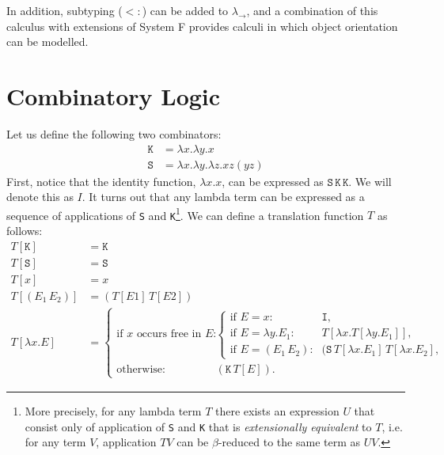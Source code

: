 \documentclass[11pt,twoside,a4paper]{article} %
\newcommand{\sym}[1]{\texttt{#1}}
\newcommand{\msym}[1]{\mathtt{#1}}
\begin{document}
In addition, subtyping ($<:$) can be added to $\lambda_\rightarrow$, and a
combination of this calculus with extensions of System F provides calculi in
which object orientation can be modelled.

\section{Combinatory Logic}

Let us define the following two combinators:
\begin{align*}
\msym{K} &= \lambda x.\lambda y.x \\
\msym{S} &= \lambda x.\lambda y.\lambda z.x z (y z)
\end{align*}
First, notice that the identity function, $\lambda x.x$, can be expressed as 
$\msym{S}\,\msym{K}\,\msym{K}$. We will denote this as $I$. It turns out that any 
lambda term can be expressed as a sequence of applications 
of \sym{S} and \sym{K}\footnote{More precisely, for any lambda term $T$ there exists an
expression $U$ that consist only of application of \sym{S} and \sym{K} that is 
\textit{extensionally equivalent} to $T$, i.e. for any term $V$, application $TV$ can be
$\beta$-reduced to the same term as $UV$.}. We can define a translation function
$T$ as follows:
\begin{align*}
T[\msym{K}]    &= \msym{K} \\
T[\msym{S}]    &= \msym{S} \\
T[x]           &= x \\
T[(E_1\,E_2)]  &= (T[E1]\,T[E2]) \\
T[\lambda x.E] &= \begin{cases}
    \text{if $x$ occurs free in $E$:} & \begin{cases}
        \text{if $E=x$:}             & \msym{I},\\
        \text{if $E=\lambda y.E_1$:} & T[\lambda x.T[\lambda y.E_1]], \\
        \text{if $E=(E_1\,E_2)$:}    & (\msym{S}\,T[\lambda x.E_1]\,T[\lambda x.E_2
        ],
    \end{cases} \\
    \text{otherwise:} & (\msym{K}\,T[E]).
  \end{cases}
\end{align*}
\end{document}
